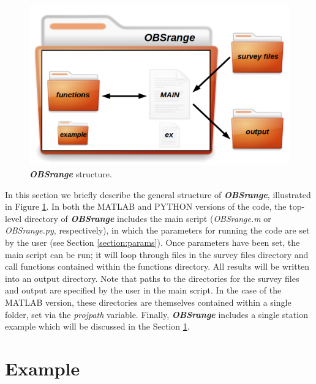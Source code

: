 \documentclass[titlepage, 12pt]{article}
\begin{document}
   \begin{figure}[h]
    \includegraphics[width=\linewidth]{OBSrange_structure.png}
    \caption{\textbf{\textit{OBSrange}} structure.}
    \label{fig:struct}
   \end{figure}

   In this section we briefly describe the general structure of \textbf{\textit{OBSrange}},  illustrated in Figure \ref{fig:struct}. In both the MATLAB and PYTHON versions of the code, the top-level directory of \textbf{\textit{OBSrange}} includes the main script (\textit{OBSrange.m} or \textit{OBSrange.py}, respectively), in which the parameters for running the code are set by the user (see Section \ref{section:params}). Once parameters have been set, the main script can be run; it will loop through files in the survey files directory and call functions contained within the functions directory. All results will be written into an output directory. Note that paths to the directories for the survey files and output are specified by the user in the main script. In the case of the MATLAB version, these directories are themselves contained within a single folder, set via the \textit{projpath} variable. Finally, \textbf{\textit{OBSrange}} includes a single station example which will be discussed in the Section \ref{section:ex}.

 
 \section{Example}
 \label{section:ex}
\end{document}
